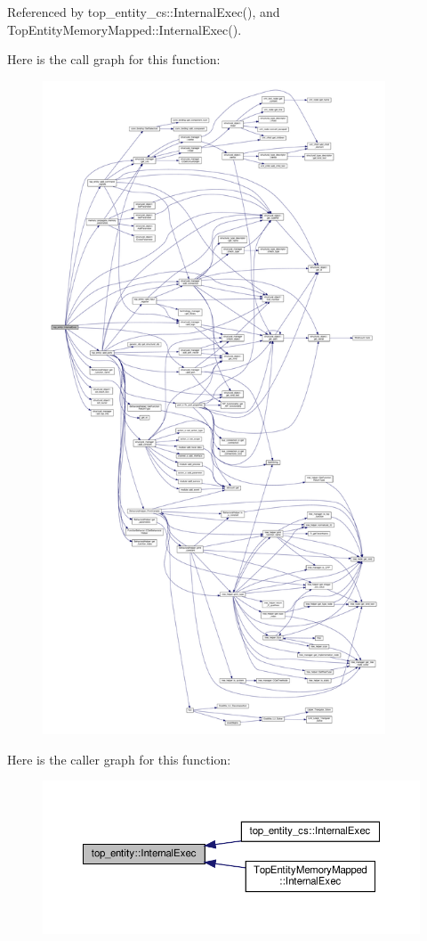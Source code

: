 Referenced by top\+\_\+entity\+\_\+cs\+::\+Internal\+Exec(), and Top\+Entity\+Memory\+Mapped\+::\+Internal\+Exec().

Here is the call graph for this function\+:
\nopagebreak
\begin{figure}[H]
\begin{center}
\leavevmode
\includegraphics[height=550pt]{d0/d0e/classtop__entity_ae3b1c2be3024a1f3abfe3066d8db12fb_cgraph}
\end{center}
\end{figure}
Here is the caller graph for this function\+:
\nopagebreak
\begin{figure}[H]
\begin{center}
\leavevmode
\includegraphics[width=350pt]{d0/d0e/classtop__entity_ae3b1c2be3024a1f3abfe3066d8db12fb_icgraph}
\end{center}
\end{figure}


